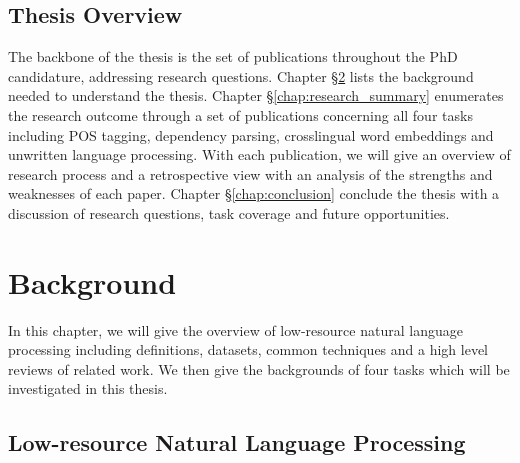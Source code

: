 \documentclass[12pt,twoside,final,hidelinks]{ltthesis}
\theoremstyle{definition}
\begin{document}
\section{Thesis Overview}
The backbone of the thesis is the set of publications throughout the PhD candidature, addressing research questions. 
Chapter \S\ref{chap:background} lists the background needed to understand the thesis. Chapter \S\ref{chap:research_summary} enumerates the research outcome 
through a set of publications concerning all four tasks including POS tagging, dependency parsing, crosslingual word embeddings and unwritten language processing. 
With each publication, we will give an overview of research process and a retrospective view with an analysis of the strengths and weaknesses of each paper. Chapter \S\ref{chap:conclusion} conclude the thesis with a discussion of research questions, task coverage and future opportunities. 


%

\chapter{Background}
\label{chap:background}
In this chapter, we will give the overview of low-resource natural language processing including definitions, datasets, common techniques and a high level reviews of related work. We then give the backgrounds of four tasks which will be investigated in this thesis. 

\section{Low-resource Natural Language Processing}
\end{document}
